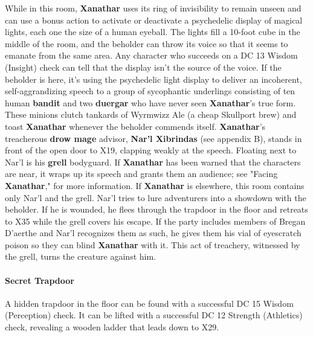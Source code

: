 \documentclass[10pt,a4paper,twoside,twocolumn,openany,nodeprecatedcode]{dndbook}
\begin{document}
While in this room, \textbf{Xanathar} uses its ring of invisibility to remain unseen and can use a bonus action to activate or deactivate a psychedelic display of magical lights, each one the size of a human eyeball. The lights fill a 10-foot cube in the middle of the room, and the beholder can throw its voice so that it seems to emanate from the same area. Any character who succeeds on a DC 13 Wisdom (Insight) check can tell that the display isn't the source of the voice.
If the beholder is here, it's using the psychedelic light display to deliver an incoherent, self-aggrandizing speech to a group of sycophantic underlings consisting of ten human \textbf{bandit} and two \textbf{duergar} who have never seen \textbf{Xanathar}'s true form. These minions clutch tankards of Wyrmwizz Ale (a cheap Skullport brew) and toast \textbf{Xanathar} whenever the beholder commends itself. \textbf{Xanathar}'s treacherous \textbf{drow mage} advisor, \textbf{Nar'l Xibrindas} (see appendix B), stands in front of the open door to X19, clapping weakly at the speech. Floating next to Nar'l is his \textbf{grell} bodyguard. If \textbf{Xanathar} has been warned that the characters are near, it wraps up its speech and grants them an audience; see "Facing \textbf{Xanathar}," for more information.
If \textbf{Xanathar} is elsewhere, this room contains only Nar'l and the grell. Nar'l tries to lure adventurers into a showdown with the beholder. If he is wounded, he flees through the trapdoor in the floor and retreats to X35 while the grell covers his escape.
If the party includes members of Bregan D'aerthe and Nar'l recognizes them as such, he gives them his vial of eyescratch poison so they can blind \textbf{Xanathar} with it. This act of treachery, witnessed by the grell, turns the creature against him.
\paragraph{Secret Trapdoor}
A hidden trapdoor in the floor can be found with a successful DC 15 Wisdom (Perception) check. It can be lifted with a successful DC 12 Strength (Athletics) check, revealing a wooden ladder that leads down to X29.
\end{document}
